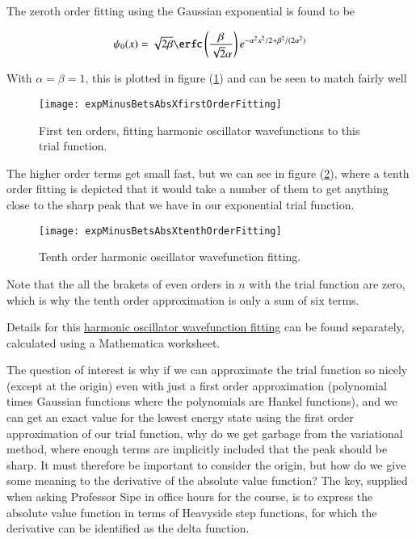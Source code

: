 The zeroth order fitting using the Gaussian exponential is found to be

\begin{equation}\label{eqn:variationHarmonicOscillator:310}
\psi_0(x) = \sqrt{2 \beta} 
\erfc\left(\frac{\beta }{\sqrt{2} \alpha }\right)
e^{- \alpha^2 x^2/2 +\beta^2/(2 \alpha^2)} 
\end{equation}

With $\alpha = \beta = 1$, this is plotted in figure (\ref{fig:variationHarmonicOscillator:expMinusBetsAbsXfirstOrderFitting}) and can be seen to match fairly well

\begin{figure}[htp]
\centering
\texttt{[image: expMinusBetsAbsXfirstOrderFitting]}
\caption{First ten orders, fitting harmonic oscillator wavefunctions to this trial function.}\label{fig:variationHarmonicOscillator:expMinusBetsAbsXfirstOrderFitting}
\end{figure}

The higher order terms get small fast, but we can see in figure (\ref{fig:variationHarmonicOscillator:expMinusBetsAbsXtenthOrderFitting}), where a tenth order fitting is depicted that it would take a number of them to get anything close to the sharp peak that we have in our exponential trial function.

\begin{figure}[htp]
\centering
\texttt{[image: expMinusBetsAbsXtenthOrderFitting]}
\caption{Tenth order harmonic oscillator wavefunction fitting.}\label{fig:variationHarmonicOscillator:expMinusBetsAbsXtenthOrderFitting}
\end{figure}

Note that the all the brakets of even orders in $n$ with the trial function are zero, which is why the tenth order approximation is only a sum of six terms.

Details for this \href{https://github.com/peeterjoot/physicsplay/blob/master/notes/phy456/gaussian\%20fitting\%20for\%20abs\%20function.nb}{harmonic oscillator wavefunction fitting} can be found separately, calculated using a Mathematica worksheet.

The question of interest is why if we can approximate the trial function so nicely (except at the origin) even with just a first order approximation (polynomial times Gaussian functions where the polynomials are Hankel functions), and we can get an exact value for the lowest energy state using the first order approximation of our trial function, why do we get garbage from the variational method, where enough terms are implicitly included that the peak should be sharp.  It must therefore be important to consider the origin, but how do we give some meaning to the derivative of the absolute value function?  The key, supplied when asking Professor Sipe in office hours for the course, is to express the absolute value function in terms of Heavyside step functions, for which the derivative can be identified as the delta function.

